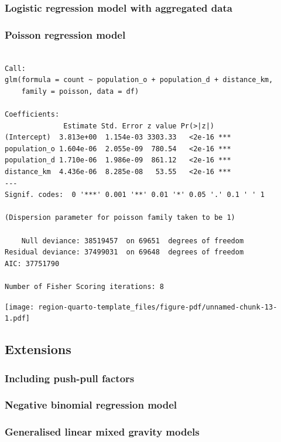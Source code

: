 \documentclass[
  a4paper, 
  twoside,
  final
]{article}
\newcounter{code}
\begin{document}
\subsubsection{Logistic regression model with aggregated
data}\label{logistic-regression-model-with-aggregated-data}

\subsubsection{Poisson regression model}\label{poisson-regression-model}

\begin{verbatim}

Call:
glm(formula = count ~ population_o + population_d + distance_km, 
    family = poisson, data = df)

Coefficients:
              Estimate Std. Error z value Pr(>|z|)    
(Intercept)  3.813e+00  1.154e-03 3303.33   <2e-16 ***
population_o 1.604e-06  2.055e-09  780.54   <2e-16 ***
population_d 1.710e-06  1.986e-09  861.12   <2e-16 ***
distance_km  4.436e-06  8.285e-08   53.55   <2e-16 ***
---
Signif. codes:  0 '***' 0.001 '**' 0.01 '*' 0.05 '.' 0.1 ' ' 1

(Dispersion parameter for poisson family taken to be 1)

    Null deviance: 38519457  on 69651  degrees of freedom
Residual deviance: 37499031  on 69648  degrees of freedom
AIC: 37751790

Number of Fisher Scoring iterations: 8
\end{verbatim}

\texttt{[image: region-quarto-template\_files/figure-pdf/unnamed-chunk-13-1.pdf]}

\subsection{Extensions}\label{extensions}

\subsubsection{Including push-pull
factors}\label{including-push-pull-factors}

\subsubsection{Negative binomial regression
model}\label{negative-binomial-regression-model}

\subsubsection{Generalised linear mixed gravity
models}\label{generalised-linear-mixed-gravity-models}
\end{document}
